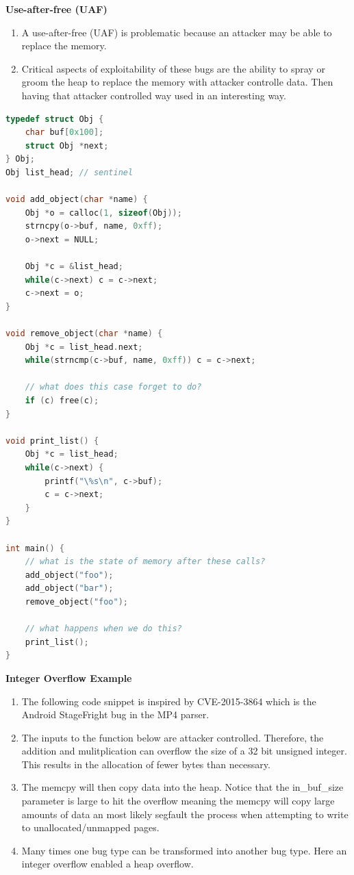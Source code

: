 \documentclass[12pt]{Training}
\begin{document}
\textbf{Use-after-free (UAF)}
\begin{enumerate}
    \item A use-after-free (UAF) is problematic because an attacker may be able to replace the memory.
    \item Critical aspects of exploitability of these bugs are the ability to spray or groom the heap to replace the memory with attacker controlle data. Then having that attacker controlled way used in an interesting way.
\end{enumerate}
\begin{sectionbox}
\begin{lstlisting}[language=C, caption={Use-after-free}]
typedef struct Obj {
    char buf[0x100];
    struct Obj *next;
} Obj;
Obj list_head; // sentinel

void add_object(char *name) {
    Obj *o = calloc(1, sizeof(Obj));
    strncpy(o->buf, name, 0xff);
    o->next = NULL;

    Obj *c = &list_head;
    while(c->next) c = c->next;
    c->next = o;
}

void remove_object(char *name) {
    Obj *c = list_head.next;
    while(strncmp(c->buf, name, 0xff)) c = c->next;

    // what does this case forget to do?
    if (c) free(c);
}

void print_list() {
    Obj *c = list_head;
    while(c->next) {
        printf("\%s\n", c->buf);
        c = c->next;
    }
}

int main() {
    // what is the state of memory after these calls?
    add_object("foo");
    add_object("bar");
    remove_object("foo");

    // what happens when we do this?
    print_list();
}
\end{lstlisting}
\end{sectionbox}

\textbf{Integer Overflow Example}
\begin{enumerate}
	\item The following code snippet is inspired by CVE-2015-3864 which is the Android StageFright bug in the MP4 parser.
	\item The inputs to the function below are attacker controlled. Therefore, the addition and mulitplication can overflow the size of a 32 bit unsigned integer. This results in the allocation of fewer bytes than necessary.
	\item The memcpy will then copy data into the heap. Notice that the in\_buf\_size parameter is large to hit the overflow meaning the memcpy will copy large amounts of data an most likely segfault the process when attempting to write to unallocated/unmapped pages.
	\item Many times one bug type can be transformed into another bug type. Here an integer overflow enabled a heap overflow.
\end{enumerate}
\end{document}
